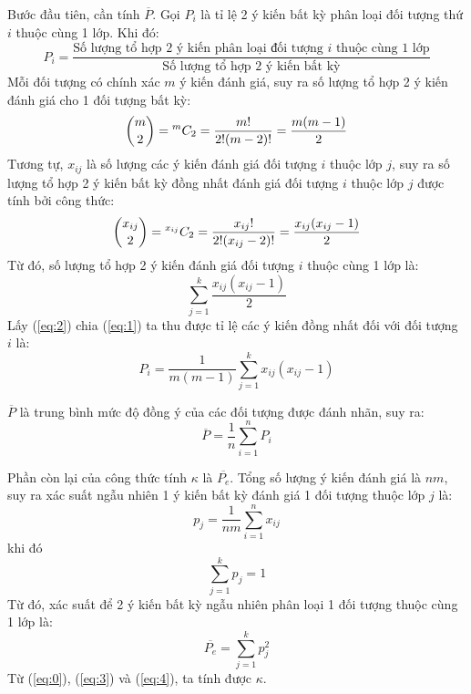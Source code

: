 Bước đầu tiên, cần tính $\overline{P}$. Gọi $P_i$ là tỉ lệ 2 ý kiến bất kỳ phân loại đối tượng thứ $i$ thuộc cùng 1 lớp. Khi đó:
$$P_i = \dfrac{\text{Số lượng tổ hợp 2 ý kiến phân loại đối tượng } i \text{ thuộc cùng 1 lớp}}{\text{Số lượng tổ hợp 2 ý kiến bất kỳ}}$$
Mỗi đối tượng có chính xác $m$ ý kiến đánh giá, suy ra số lượng tổ hợp 2 ý kiến đánh giá cho 1 đối tượng bất kỳ:
\begin{equation}\label{eq:1}
\binom m2={}^{m}C_{2}=\frac{m!}{2!(m-2)!} = \dfrac{m(m-1)}{2}
\end{equation}
Tương tự, $x_{ij}$ là số lượng các ý kiến đánh giá đối tượng $i$ thuộc lớp $j$, suy ra số lượng tổ hợp 2 ý kiến bất kỳ đồng nhất đánh giá đối tượng $i$ thuộc lớp $j$ được tính bởi công thức:
$$\binom {x_{ij}}2={}^{x_{ij}}C_{2}=\frac{x_{ij}!}{2!(x_{ij}-2)!} = \dfrac{x_{ij}(x_{ij}-1)}{2}$$
Từ đó, số lượng tổ hợp 2 ý kiến đánh giá đối tượng $i$ thuộc cùng 1 lớp là:
\begin{equation}\label{eq:2}
\sum_{j=1}^{k}\dfrac{x_{ij}(x_{ij}-1)}{2}
\end{equation}
Lấy (\ref{eq:2}) chia (\ref{eq:1}) ta thu được tỉ lệ các ý kiến đồng nhất đối với đối tượng $i$ là:
$$P_i = \dfrac{1}{m(m-1)}\sum_{j=1}^{k}x_{ij}(x_{ij}-1)$$

$\overline{P}$ là trung bình mức độ đồng ý của các đối tượng được đánh nhãn, suy ra:
\begin{equation} \label{eq:3}
\overline{P} = \dfrac{1}{n}\sum_{i=1}^{n}P_i
\end{equation}

Phần còn lại của công thức tính $\kappa$ là $\overline{P_e}$. Tổng số lượng ý kiến đánh giá là $nm$, suy ra xác suất ngẫu nhiên 1 ý kiến bất kỳ đánh giá 1 đối tượng thuộc lớp $j$ là:
$$p_j = \dfrac{1}{nm} \sum_{i=1}^{n} x_{ij}$$ khi đó $$\sum_{j=1}^{k} p_j=1$$
Từ đó, xác suất để 2 ý kiến bất kỳ ngẫu nhiên phân loại 1 đối tượng thuộc cùng 1 lớp là:
\begin{equation}\label{eq:4}
\overline{P_e} = \sum_{j=1}^{k}p_j^{2}
\end{equation}
Từ (\ref{eq:0}), (\ref{eq:3}) và (\ref{eq:4}), ta tính được $\kappa$.\\

